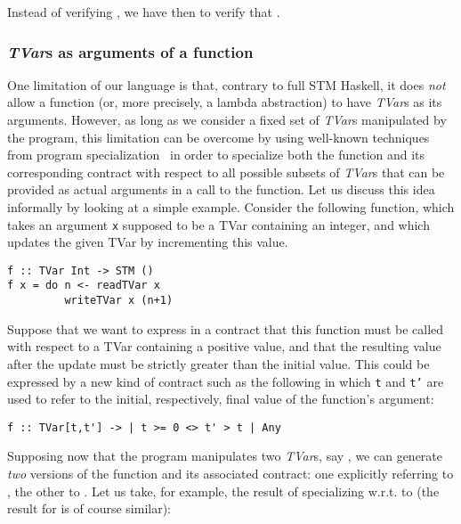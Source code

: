\documentclass[submission,copyright,creativecommons]{eptcs}
\begin{document}
\begin{center}

\end{center}
Instead of verifying , we have then to verify that .

\subsubsection*{\emph{TVar}s as arguments of a function} 
One limitation of our language  is that, contrary to full STM Haskell, it does \emph{not} allow a function (or, more precisely, a lambda abstraction) to have \emph{TVar}s as its arguments.  
However, as long as we consider a fixed set of \emph{TVar}s manipulated by the program, this limitation can be overcome by using well-known techniques from program specialization~\cite{partial-evaluation-automatic,introduction-program-specialisation} in order to specialize both the function and its corresponding contract with respect to all possible subsets of \emph{TVar}s that can be provided as actual arguments in a call to the function.
Let us discuss this idea informally by looking at a simple example. Consider the following function, which takes an argument \texttt{x} supposed to be a TVar containing an integer, and which updates the given TVar by incrementing this value.

\begin{footnotesize}
\begin{verbatim}
f :: TVar Int -> STM ()
f x = do n <- readTVar x
         writeTVar x (n+1)
\end{verbatim}
\end{footnotesize}
Suppose that we want to express in a contract that this function must be called with respect to a TVar containing a positive value, and that the resulting value after the update must be strictly greater than the initial value. This could be expressed by a new kind of contract such as the following in which \texttt{t} and \texttt{t'} are used to refer to the initial, respectively, final value of the function's argument:

\begin{footnotesize}
\begin{verbatim}
f :: TVar[t,t'] -> | t >= 0 <> t' > t | Any 
\end{verbatim}
\end{footnotesize}
Supposing now that the program manipulates two \emph{TVar}s, say , we can generate \emph{two} versions of the function and its associated contract: one explicitly referring to , the other to . Let us take, for example, the result of specializing w.r.t. to  (the result for  is of course similar):
\end{document}
